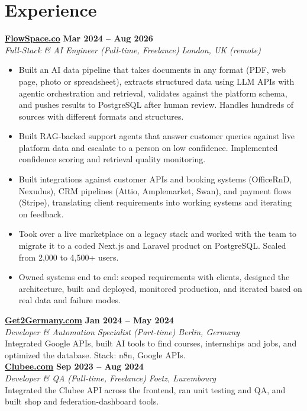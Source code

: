 \documentclass[a4paper,10pt]{article}
\newcommand{\role}[4]{%
 \textbf{#1} \hfill \textbf{#2}\\[1pt]%
 \textit{#3} \hfill \textit{#4}\\[2pt]%
}
\begin{document}
\section{Experience}

\role{\href{https://flowspace.co}{FlowSpace.co}}{Mar 2024 -- Aug 2026}{Full-Stack \& AI Engineer (Full-time, Freelance)}{London, UK (remote)}
\begin{itemize}
 \item Built an AI data pipeline that takes documents in any format (PDF, web page, photo or spreadsheet), extracts structured data using LLM APIs with agentic orchestration and retrieval, validates against the platform schema, and pushes results to PostgreSQL after human review. Handles hundreds of sources with different formats and structures.
 \item Built RAG-backed support agents that answer customer queries against live platform data and escalate to a person on low confidence. Implemented confidence scoring and retrieval quality monitoring.
 \item Built integrations against customer APIs and booking systems (OfficeRnD, Nexudus), CRM pipelines (Attio, Amplemarket, Swan), and payment flows (Stripe), translating client requirements into working systems and iterating on feedback.
 \item Took over a live marketplace on a legacy stack and worked with the team to migrate it to a coded Next.js and Laravel product on PostgreSQL. Scaled from 2,000 to 4,500+ users.
 \item Owned systems end to end: scoped requirements with clients, designed the architecture, built and deployed, monitored production, and iterated based on real data and failure modes.
\end{itemize}

\role{\href{https://get2germany.com}{Get2Germany.com}}{Jan 2024 -- May 2024}{Developer \& Automation Specialist (Part-time)}{Berlin, Germany}
Integrated Google APIs, built AI tools to find courses, internships and jobs, and optimized the database. Stack: n8n, Google APIs.\\[1pt]

\role{\href{https://clubee.com}{Clubee.com}}{Sep 2023 -- Aug 2024}{Developer \& QA (Full-time, Freelance)}{Foetz, Luxembourg}
Integrated the Clubee API across the frontend, ran unit testing and QA, and built shop and federation-dashboard tools.\\[1pt]
\end{document}

